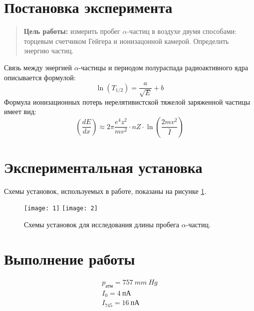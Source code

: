 \documentclass{lab}
\begin{document}

\section*{Постановка эксперимента}

\begin{quote}
	\textbf{{\normalsize Цель работы: }}измерить пробег $ \alpha $-частиц в воздухе двумя способами: торцевым счетчиком Гейгера и ионизацонной камерой. Определить энергию частиц.
\end{quote}
	
Связь между энергией $ \alpha $-частицы и периодом полураспада радиоактивного ядра описывается формулой:
\begin{equation}
\ln\left( T_{1/2} \right) = \dfrac{a}{\sqrt{E}} + b
\end{equation}
Формула ионизационных потерь нерелятивистской тяжелой заряженной частицы имеет вид:
\begin{equation}
\left( \dfrac{dE}{dx} \right) \approx 2\pi \dfrac{e^4z^2}{mv^2}\cdot nZ \cdot \ln\left( \dfrac{2mv^2}{\bar{I}} \right)
\end{equation}

\section*{Экспериментальная установка}

	Схемы установок, используемых в работе, показаны на рисунке \ref{1}.
	
	\begin{figure} [h!]
		\centering
		\texttt{[image: 1]}
		\texttt{[image: 2]}
		\caption{Схемы установок для исследования длины пробега $ \alpha $-частиц.}
		\label{1}
	\end{figure}


\newpage

\section*{Выполнение работы}
\begin{gather*}
	p_{атм} = 757~mm~Hg\\
	I_0 = 4~пА\\
	I_{745} = 16~пА
\end{gather*}
\end{document}
